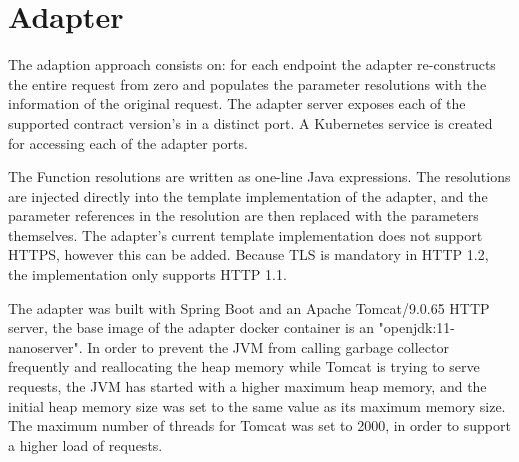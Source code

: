 \section{Adapter} %
\label{sec:adapter}

The adaption approach consists on: for each endpoint the
adapter re-constructs the entire request from zero and populates the parameter resolutions with the information of the original request.
The adapter server exposes each of the supported contract version's in a distinct port.
A Kubernetes service is created for accessing each of the adapter ports.

The Function resolutions are written as one-line Java expressions.
The resolutions are injected directly into the template implementation of the adapter, and the parameter references in the resolution are then replaced with the parameters themselves.
The adapter's current template implementation does not support HTTPS, however this can be added.
Because TLS is mandatory in HTTP 1.2, the implementation only supports HTTP 1.1.

The adapter was built with Spring Boot and an Apache Tomcat/9.0.65 HTTP server, the base image of the adapter docker container is an "openjdk:11-nanoserver".
In order to prevent the JVM from calling garbage collector frequently and reallocating the heap memory while Tomcat is trying to serve requests,
the JVM has started with a higher maximum heap memory, and the initial heap memory
size was set to the same value as its maximum memory size.
The maximum number of threads for Tomcat was set to 2000, in order to support a higher load of requests.

